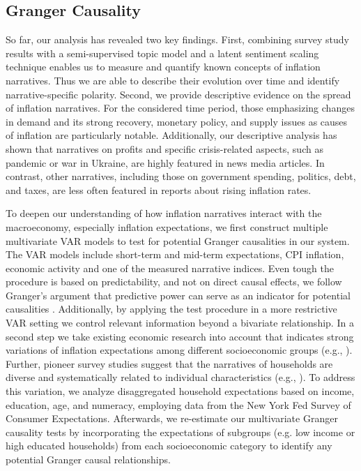 \subsection{Granger Causality}

So far, our analysis has revealed two key findings. First, combining survey study results with a semi-supervised topic model and a latent sentiment scaling technique enables us to measure and quantify known concepts of inflation narratives. Thus we are able to describe their evolution over time and identify narrative-specific polarity. Second, we provide descriptive evidence on the spread of inflation narratives. For the considered time period, those emphasizing changes in demand and its
strong recovery, monetary policy, and supply issues as causes of inflation are particularly notable. Additionally, our descriptive analysis has shown that narratives on profits and specific crisis-related aspects, such as pandemic or war in Ukraine, are highly featured in news media articles. In contrast, other narratives, including those on government spending, politics, debt, and taxes, are less often featured in reports about rising inflation rates.
	
To deepen our understanding of how inflation narratives interact with the macroeconomy, especially inflation expectations, we first construct multiple multivariate VAR models to test for potential Granger causalities in our system. The VAR models include short-term and mid-term expectations, CPI inflation, economic activity and one of the measured narrative indices. Even tough the procedure is based on predictability, and not on direct causal effects, we follow Granger's argument that predictive power can serve as an indicator for potential causalities \citep{shojaie.2022}. Additionally, by applying the test procedure in a more restrictive VAR setting we control relevant information beyond a bivariate relationship. In a second step we take existing economic research into account that indicates strong variations of inflation expectations among different socioeconomic groups (e.g., \citet{ecb.2021, Weber.etal.2022}). Further, pioneer survey studies suggest that the narratives of households are diverse and systematically related to individual characteristics (e.g., \citet{Andre.2023, Demgensky.2023}). To address this variation, we analyze disaggregated household expectations based on income, education, age, and numeracy, employing data from the New York Fed Survey of Consumer Expectations. Afterwards, we re-estimate our multivariate Granger causality tests by incorporating the expectations of subgroups (e.g. low income or high educated households) from each socioeconomic category to identify any potential Granger causal relationships.

